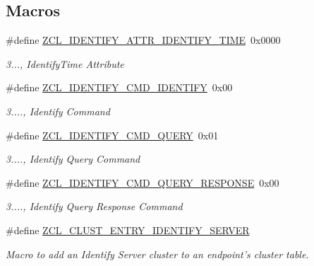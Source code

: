 \subsection*{Macros}
\begin{DoxyCompactItemize}
\item 
\hypertarget{group__zcl__identify_ga7df877a02f273adc190aa24ad0aff4c9}{\#define \hyperlink{group__zcl__identify_ga7df877a02f273adc190aa24ad0aff4c9}{Z\-C\-L\-\_\-\-I\-D\-E\-N\-T\-I\-F\-Y\-\_\-\-A\-T\-T\-R\-\_\-\-I\-D\-E\-N\-T\-I\-F\-Y\-\_\-\-T\-I\-M\-E}~0x0000}\label{group__zcl__identify_ga7df877a02f273adc190aa24ad0aff4c9}

\begin{DoxyCompactList}\small\item\em 3..., Identify\-Time Attribute \end{DoxyCompactList}\item 
\hypertarget{group__zcl__identify_ga40368a52613d3ef210919d39a8e5d046}{\#define \hyperlink{group__zcl__identify_ga40368a52613d3ef210919d39a8e5d046}{Z\-C\-L\-\_\-\-I\-D\-E\-N\-T\-I\-F\-Y\-\_\-\-C\-M\-D\-\_\-\-I\-D\-E\-N\-T\-I\-F\-Y}~0x00}\label{group__zcl__identify_ga40368a52613d3ef210919d39a8e5d046}

\begin{DoxyCompactList}\small\item\em 3...., Identify Command \end{DoxyCompactList}\item 
\hypertarget{group__zcl__identify_ga47774d9c6e213ee27738493dcf6e3f23}{\#define \hyperlink{group__zcl__identify_ga47774d9c6e213ee27738493dcf6e3f23}{Z\-C\-L\-\_\-\-I\-D\-E\-N\-T\-I\-F\-Y\-\_\-\-C\-M\-D\-\_\-\-Q\-U\-E\-R\-Y}~0x01}\label{group__zcl__identify_ga47774d9c6e213ee27738493dcf6e3f23}

\begin{DoxyCompactList}\small\item\em 3...., Identify Query Command \end{DoxyCompactList}\item 
\hypertarget{group__zcl__identify_ga19fdbf2dca0a6d6fc36021c51d31214c}{\#define \hyperlink{group__zcl__identify_ga19fdbf2dca0a6d6fc36021c51d31214c}{Z\-C\-L\-\_\-\-I\-D\-E\-N\-T\-I\-F\-Y\-\_\-\-C\-M\-D\-\_\-\-Q\-U\-E\-R\-Y\-\_\-\-R\-E\-S\-P\-O\-N\-S\-E}~0x00}\label{group__zcl__identify_ga19fdbf2dca0a6d6fc36021c51d31214c}

\begin{DoxyCompactList}\small\item\em 3...., Identify Query Response Command \end{DoxyCompactList}\item 
\#define \hyperlink{group__zcl__identify_gaeae5b3a460629b095247d160235ec586}{Z\-C\-L\-\_\-\-C\-L\-U\-S\-T\-\_\-\-E\-N\-T\-R\-Y\-\_\-\-I\-D\-E\-N\-T\-I\-F\-Y\-\_\-\-S\-E\-R\-V\-E\-R}
\begin{DoxyCompactList}\small\item\em Macro to add an Identify Server cluster to an endpoint's cluster table. \end{DoxyCompactList}\end{DoxyCompactItemize}
